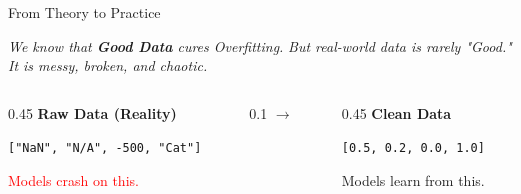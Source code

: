 \begin{frame}{From Theory to Practice}

    \centering
    \large
    \textit{We know that \textbf{Good Data} cures Overfitting.}
    \vspace{0.5em}
    \textit{But real-world data is rarely "Good." It is messy, broken, and chaotic.}

    \vspace{1.5em}
    
    \begin{columns}[T]
        \begin{column}{0.45\textwidth}
            \centering
            \textbf{Raw Data (Reality)}
            \vspace{0.5em}
            \begin{tcolorbox}[colback=gray!10, boxrule=0pt]
                \centering \small
                \texttt{["NaN", "N/A", -500, "Cat"]}
            \end{tcolorbox}
            \small \textcolor{red}{Models crash on this.}
        \end{column}
        
        \begin{column}{0.1\textwidth}
            \centering \vspace{1cm} \Huge $\rightarrow$
        \end{column}
        
        \begin{column}{0.45\textwidth}
            \centering
            \textbf{Clean Data}
            \vspace{0.5em}
            \begin{tcolorbox}[colback=green!10, boxrule=0pt]
                \centering \small
                \texttt{[0.5, 0.2, 0.0, 1.0]}
            \end{tcolorbox}
            \small \textcolor{green!60!black}{Models learn from this.}
        \end{column}
    \end{columns}

\end{frame}

